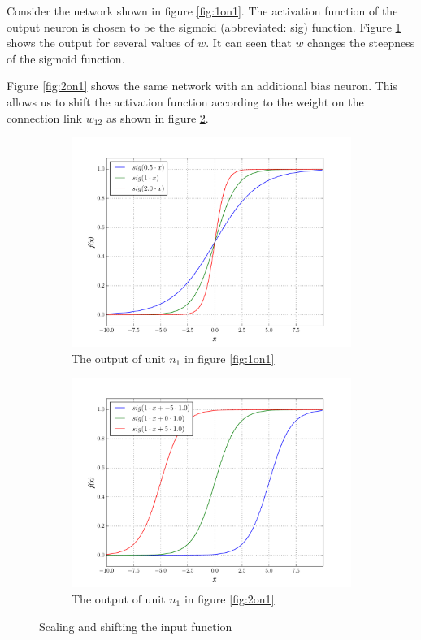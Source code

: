 \documentclass[10pt,a4paper,DIV=11]{scrreprt}
\begin{document}
Consider the network shown in figure \ref{fig:1on1}. The activation function of the output neuron is chosen to be the sigmoid (abbreviated: sig) 
function. Figure \ref{fig:sigmoid-scale} shows the output for several values of $w$. It can seen that $w$ changes the steepness of the 
sigmoid function. 

Figure \ref{fig:2on1} shows the same network with an additional bias neuron. This allows us to shift the activation function according to the 
weight on the connection link $w_{12}$ as shown in figure \ref{fig:sigmoid-shift}.

\begin{figure}[H]

\centering
\begin{subfigure}{.5\textwidth}
  \centering
  \includegraphics[width=1.1\linewidth]{files/activation/sigsc.pdf}
  \caption{The output of unit $n_1$ in figure \ref{fig:1on1}}
  \label{fig:sigmoid-scale}
\end{subfigure}%
\begin{subfigure}{.5\textwidth}
  \centering
  \includegraphics[width=1.1\linewidth]{files/activation/sigsh.pdf}
  \caption{The output of unit $n_1$ in figure \ref{fig:2on1}}
  \label{fig:sigmoid-shift}
\end{subfigure}
\newline
\caption{Scaling and shifting the input function}
\label{fig:scaling}
\end{figure}
\end{document}
